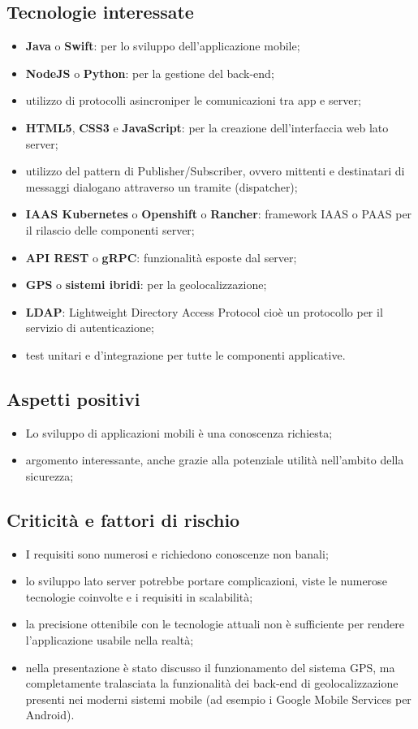 \subsection{Tecnologie interessate}
\begin{itemize}
	\item \textbf{Java} o \textbf{Swift}: per lo sviluppo dell'applicazione mobile;
	\item \textbf{NodeJS} o \textbf{Python}: per la gestione del back-end;
	\item utilizzo di protocolli asincroni\glosp per le comunicazioni tra app e server;
	\item \textbf{HTML5}, \textbf{CSS3} e \textbf{JavaScript}: per la creazione dell'interfaccia web lato server;
	\item utilizzo del pattern di Publisher/Subscriber, ovvero mittenti e destinatari di messaggi dialogano attraverso un tramite (dispatcher\glo);
	\item \textbf{IAAS Kubernetes} o \textbf{Openshift} o \textbf{Rancher}: framework IAAS o PAAS per il rilascio delle componenti server;
	\item \textbf{API REST} o \textbf{gRPC}: funzionalità esposte dal server;
	\item \textbf{GPS} o \textbf{sistemi ibridi}: per la geolocalizzazione;
	\item \textbf{LDAP}: Lightweight Directory Access Protocol cioè un protocollo per il servizio di autenticazione;
	\item test unitari e d'integrazione per tutte le componenti applicative.
\end{itemize}

\subsection{Aspetti positivi}
\begin{itemize}
	\item Lo sviluppo di applicazioni mobili è una conoscenza richiesta;
	\item argomento interessante, anche grazie alla potenziale utilità nell'ambito della sicurezza;
\end{itemize}

\subsection{Criticità e fattori di rischio}
\begin{itemize}
	\item I requisiti sono numerosi e richiedono conoscenze non banali;
	\item lo sviluppo lato server potrebbe portare complicazioni, viste le numerose tecnologie coinvolte e i requisiti in scalabilità;
	\item la precisione ottenibile con le tecnologie attuali non è sufficiente per rendere l’applicazione usabile nella realtà;
	\item nella presentazione è stato discusso il funzionamento del sistema GPS, ma completamente tralasciata la funzionalità dei back-end di geolocalizzazione presenti nei moderni sistemi mobile (ad esempio i Google Mobile Services per Android).
\end{itemize}

